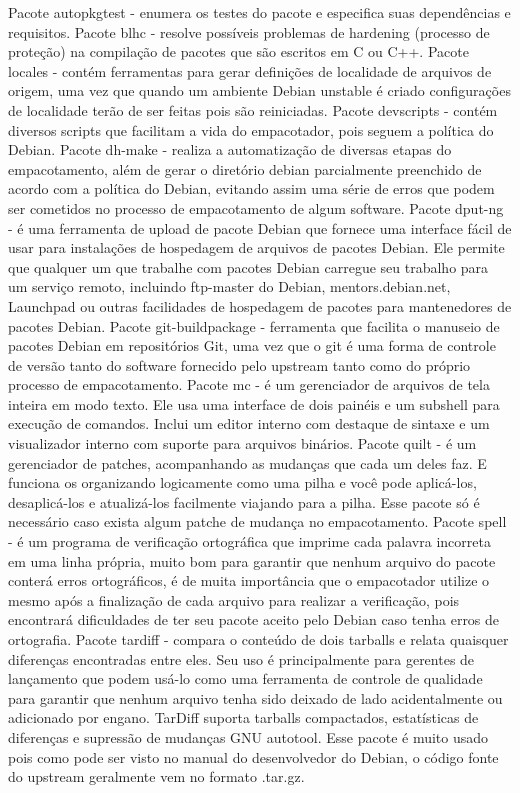 Pacote autopkgtest - enumera os testes do pacote e especifica suas dependências e requisitos.
Pacote blhc - resolve possíveis problemas de hardening (processo de proteção) na compilação de pacotes que são escritos em C ou C++.
Pacote locales - contém ferramentas para gerar definições de localidade de arquivos de origem, uma vez que quando um ambiente Debian unstable é criado configurações de localidade terão de ser feitas pois são reiniciadas.
Pacote devscripts - contém diversos scripts que facilitam a vida do empacotador, pois seguem a política do Debian. 
Pacote dh-make - realiza a automatização de diversas etapas do empacotamento, além de gerar o diretório debian parcialmente preenchido de acordo com a política do Debian, evitando assim uma série de erros que podem ser cometidos no processo de empacotamento de algum software.
Pacote dput-ng - é uma ferramenta de upload de pacote Debian que fornece uma interface fácil de usar para instalações de hospedagem de arquivos de pacotes Debian. Ele permite que qualquer um que trabalhe com pacotes Debian carregue seu trabalho para um serviço remoto, incluindo ftp-master do Debian, mentors.debian.net, Launchpad ou outras facilidades de hospedagem de pacotes para mantenedores de pacotes Debian.
Pacote git-buildpackage - ferramenta que facilita o manuseio de pacotes Debian em repositórios Git, uma vez que o git é uma forma de controle de versão tanto do software fornecido pelo upstream tanto como do próprio processo de empacotamento.
Pacote mc - é um gerenciador de arquivos de tela inteira em modo texto. Ele usa uma interface de dois painéis e um subshell para execução de comandos. Inclui um editor interno com destaque de sintaxe e um visualizador interno com suporte para arquivos binários.
Pacote quilt - é um gerenciador de patches, acompanhando as mudanças que cada um deles faz. E funciona os organizando logicamente como uma pilha e você pode aplicá-los, desaplicá-los e atualizá-los facilmente viajando para a pilha. Esse pacote só é necessário caso exista algum patche de mudança no empacotamento. 
Pacote spell - é um programa de verificação ortográfica que imprime cada palavra incorreta em uma linha própria, muito bom para garantir que nenhum arquivo do pacote conterá erros ortográficos, é de muita importância que o empacotador utilize o mesmo após a finalização de cada arquivo para realizar a verificação, pois encontrará dificuldades de ter seu pacote aceito pelo Debian caso tenha erros de ortografia.
Pacote tardiff - compara o conteúdo de dois tarballs e relata quaisquer diferenças encontradas entre eles. Seu uso é principalmente para gerentes de lançamento que podem usá-lo como uma ferramenta de controle de qualidade para garantir que nenhum arquivo tenha sido deixado de lado acidentalmente ou adicionado por engano. TarDiff suporta tarballs compactados, estatísticas de diferenças e supressão de mudanças GNU autotool. Esse pacote é muito usado pois como pode ser visto no manual do desenvolvedor do Debian, o código fonte do upstream geralmente vem no formato .tar.gz.
